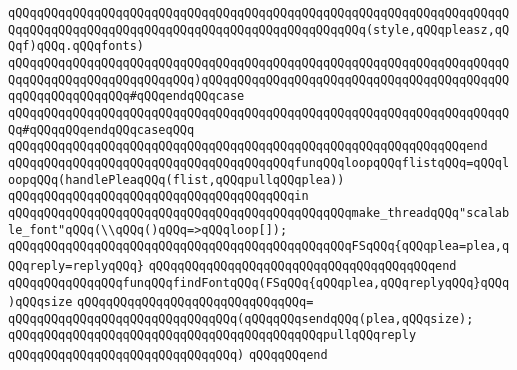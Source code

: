 \verb|qQQqqQQqqQQqqQQqqQQqqQQqqQQqqQQqqQQqqQQqqQQqqQQqqQQqqQQqqQQqqQQqqQQqqQQqqQQqqQQqqQQqqQQqqQQqqQQqqQQqqQQqqQQqqQQqqQQqqQQq(style,qQQqpleasz,qQQqf)qQQq.qQQqfonts)|\newline
\verb|qQQqqQQqqQQqqQQqqQQqqQQqqQQqqQQqqQQqqQQqqQQqqQQqqQQqqQQqqQQqqQQqqQQqqQQqqQQqqQQqqQQqqQQqqQQqqQQq)qQQqqQQqqQQqqQQqqQQqqQQqqQQqqQQqqQQqqQQqqQQqqQQqqQQqqQQqqQQq#qQQqendqQQqcase|\newline
\verb|qQQqqQQqqQQqqQQqqQQqqQQqqQQqqQQqqQQqqQQqqQQqqQQqqQQqqQQqqQQqqQQqqQQqqQQq#qQQqqQQqendqQQqcaseqQQq|\newline
\verb|qQQqqQQqqQQqqQQqqQQqqQQqqQQqqQQqqQQqqQQqqQQqqQQqqQQqqQQqqQQqqQQqend|\newline
\newline
\verb|qQQqqQQqqQQqqQQqqQQqqQQqqQQqqQQqqQQqqQQqfunqQQqloopqQQqflistqQQq=qQQqloopqQQq(handlePleaqQQq(flist,qQQqpullqQQqplea))|\newline
\verb|qQQqqQQqqQQqqQQqqQQqqQQqqQQqqQQqqQQqqQQqin|\newline
\verb|qQQqqQQqqQQqqQQqqQQqqQQqqQQqqQQqqQQqqQQqqQQqqQQqmake_threadqQQq"scalable_font"qQQq(\\qQQq()qQQq=>qQQqloop[]);|\newline
\verb|qQQqqQQqqQQqqQQqqQQqqQQqqQQqqQQqqQQqqQQqqQQqqQQqFSqQQq{qQQqplea=plea,qQQqreply=replyqQQq}|\newline
\verb|qQQqqQQqqQQqqQQqqQQqqQQqqQQqqQQqqQQqqQQqend|\newline
\newline
\verb|qQQqqQQqqQQqqQQqfunqQQqfindFontqQQq(FSqQQq{qQQqplea,qQQqreplyqQQq}qQQq)qQQqsize|\newline
\verb|qQQqqQQqqQQqqQQqqQQqqQQqqQQqqQQq=|\newline
\verb|qQQqqQQqqQQqqQQqqQQqqQQqqQQqqQQq(qQQqqQQqsendqQQq(plea,qQQqsize);|\newline
\verb|qQQqqQQqqQQqqQQqqQQqqQQqqQQqqQQqqQQqqQQqqQQqpullqQQqreply|\newline
\verb|qQQqqQQqqQQqqQQqqQQqqQQqqQQqqQQq)|\newline
\newline
\verb|qQQqqQQqend|\newline
\newline

